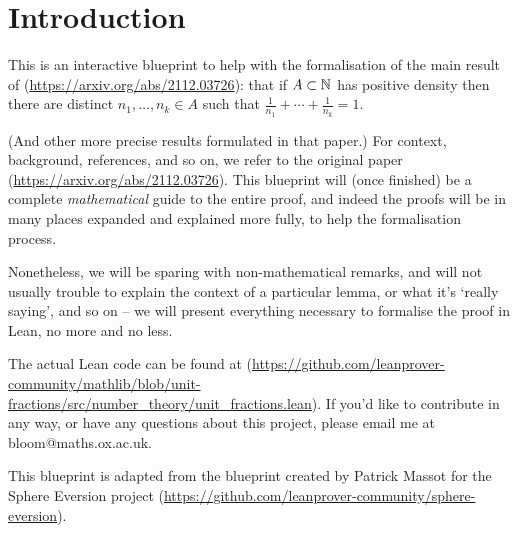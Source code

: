 \chapter*{Introduction}
\label{cha:intro}

This is an interactive blueprint to help with the formalisation of the main result of (\url{https://arxiv.org/abs/2112.03726}): that if $A\subset \mathbb{N}$ has positive density then there are distinct $n_1,\ldots,n_k\in A$ such that $\frac{1}{n_1}+\cdots+\frac{1}{n_k}=1$. 

(And other more precise results formulated in that paper.) For context, background, references, and so on, we refer to the original paper (\url{https://arxiv.org/abs/2112.03726}). This blueprint will (once finished) be a complete \emph{mathematical} guide to the entire proof, and indeed the proofs will be in many places expanded and explained more fully, to help the formalisation process.

Nonetheless, we will be sparing with non-mathematical remarks, and will not usually trouble to explain the context of a particular lemma, or what it's `really saying', and so on -- we will present everything necessary to formalise the proof in Lean, no more and no less.

The actual Lean code can be found at (\url{https://github.com/leanprover-community/mathlib/blob/unit-fractions/src/number_theory/unit_fractions.lean}). If you'd like to contribute in any way, or have any questions about this project, please email me at bloom@maths.ox.ac.uk. 

This blueprint is adapted from the blueprint created by Patrick Massot for the Sphere Eversion project (\url{https://github.com/leanprover-community/sphere-eversion}).


